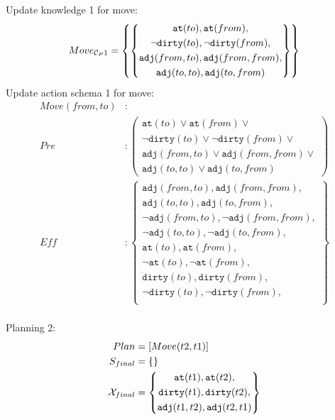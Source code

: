 \documentclass[\master/Master.tex]{subfiles}
\begin{document}
Update knowledge 1 for move:
\begin{align*}	
	Move_{\mathcal{C}_P1}& =\left\{
			\left\{
			\begin{gathered}
				\texttt{at}(to), \texttt{at}(from), \\
				\neg \texttt{dirty}(to), \neg \texttt{dirty}(from), \\
				\texttt{adj}(from,to),  \texttt{adj}(from,from), \\
				\texttt{adj}(to,to), \texttt{adj}(to,from)
			\end{gathered}
			\right\}
	  \right\} \\
\end{align*}
Update action schema 1 for move:
\begin{align*}
	Move(from,to) &: \\
	Pre &: \left(
	\begin{gathered}
		\texttt{at}(to) \lor \texttt{at}(from) \lor  \\
		\neg \texttt{dirty}(to) \lor  \neg \texttt{dirty}(from) \lor  \\
		\texttt{adj}(from,to) \lor   \texttt{adj}(from,from) \lor  \\
		\texttt{adj}(to,to) \lor  \texttt{adj}(to,from)
	\end{gathered}
	\right)
	\\
	Eff &: 
	\left\{
	\begin{gathered}
		\texttt{adj}(from,to), \texttt{adj}(from,from), \\
		\texttt{adj}(to,to), \texttt{adj}(to,from), \\
		\neg \texttt{adj}(from,to), \neg \texttt{adj}(from,from), \\
		\neg \texttt{adj}(to,to), \neg \texttt{adj}(to,from), \\					
		\texttt{at}(to), \texttt{at}(from), \\
		\neg \texttt{at}(to), \neg \texttt{at}(from), \\					
		\texttt{dirty}(to), \texttt{dirty}(from), \\
		\neg \texttt{dirty}(to), \neg \texttt{dirty}(from), \\
	\end{gathered}
	\right\}
	\\
\end{align*}

Planning 2:
\begin{align*}
	Plan &= [Move(t2,t1)]\\
	S_{final} &=  \{\}\\
	\mathcal{X}_{final} &= \left\{
				\begin{gathered}
					\texttt{at}(t1), \texttt{at}(t2), \\
					\texttt{dirty}(t1), \texttt{dirty}(t2), \\
					\texttt{adj}(t1,t2),  \texttt{adj}(t2,t1) \\
				\end{gathered}
				\right\}
\end{align*}
\end{document}
